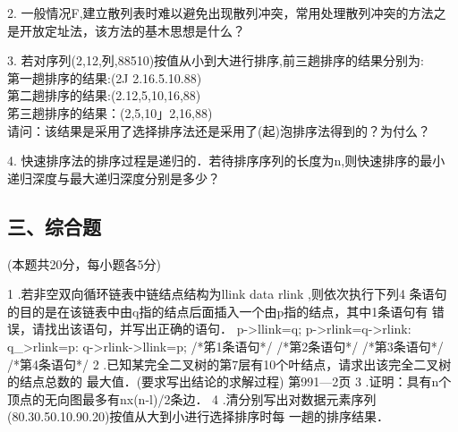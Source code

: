 2. 一般情况F,建立散列表时难以避免出现散列冲突，常用处理散列冲突的方法之 是开放定址法，该方法的基木思想是什么？

3. 若对序列(2,12,列,88510)按值从小到大进行排序,前三趟排序的结果分别为: \\
第一趟排序的结果:(2J 2.16.5.10.88) \\
第二趟排序的结果:(2.12,5,10,16,88) \\
笫三趟排序的结果：(2,5,10」2,16,88) \\
请问：该结果是采用了选择排序法还是采用了(起)泡排序法得到的？为付么？

4. 快速排序法的排序过程是递归的．若待排序序列的长度为n,则快速排序的最小 递归深度与最大递归深度分别是多少？

\subsection{三、综合题}
(本题共20分，每小题各5分)

1	.若非空双向循环链表中链结点结构为llink data rlink ,则依次执行下列4
条语句的目的是在该链表中由q指的结点后面插入一个由p指的结点，其中1条语句有
错误，请找出该语句，并写出正确的语句．
p->llink=q;
p->rlink=q->rlink: q_>rlink=p: q->rlink->llink=p;
/*笫1条语句*/ /*第2条语句*/ /*第3条语句*/ /*第4条语句*/
2	.已知某完全二叉树的第7层有10个叶结点，请求出该完全二叉树的结点总数的 最大值．(要求写出结论的求解过程)
第991—2页
3	.证明：具有n个顶点的无向图最多有nx(n-l)/2条边．
4	.清分别写出对数据元素序列(80.30.50.10.90.20)按值从大到小进行选择排序时每
一趟的排序结果．

